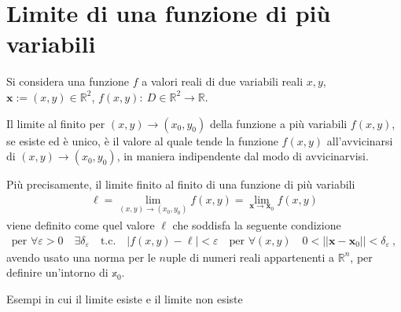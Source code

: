 \documentclass[letterpaper,10pt,italian]{jupyterBook}
\begin{document}
\section{Limite di una funzione di più variabili}
\label{\detokenize{ch/multivariable-calculus/limits:limite-di-una-funzione-di-piu-variabili}}\label{\detokenize{ch/multivariable-calculus/limits:multivariable-calculus-limit}}\label{\detokenize{ch/multivariable-calculus/limits::doc}}
\sphinxAtStartPar
Si considera una funzione \(f\) a valori reali di due variabili reali \(x,y\), \(\mathbf{x} := (x,y) \in \mathbb{R}^2\), \(f(x,y): \ D \in \mathbb{R}^2 \rightarrow \mathbb{R}\).

\sphinxAtStartPar
Il limite al finito per \((x,y) \rightarrow (x_0, y_0)\) della funzione a più variabili \(f(x,y)\), se esiste ed è unico, è il valore al quale tende la funzione \(f(x,y)\) all’avvicinarsi di \((x,y) \rightarrow (x_0, y_0)\), in maniera indipendente dal modo di avvicinarvisi.

\sphinxAtStartPar
Più precisamente, il limite finito al finito di una funzione di più variabili
\begin{equation*}
\begin{split}\ell = \lim_{(x,y) \rightarrow (x_0,y_0)} f(x,y) = \lim_{\mathbf{x} \rightarrow \mathbf{x}_0} f(x,y)\end{split}
\end{equation*}
\sphinxAtStartPar
viene definito come quel valore \(\ell\) che soddisfa la seguente condizione
\begin{equation*}
\begin{split}\text{per } \forall \varepsilon > 0 \quad \exists \delta_{\varepsilon} \quad \text{t.c.} \quad |f(x,y) - \ell| < \varepsilon \quad \text{per } \forall (x,y) \quad 0 < || \mathbf{x} - \mathbf{x}_0|| < \delta_\varepsilon \ ,\end{split}
\end{equation*}
\sphinxAtStartPar
avendo usato una norma per le \(n\)\sphinxhyphen{}uple di numeri reali appartenenti a \(\mathbb{R}^n\), per definire un’intorno di \(\mathbb{x}_0\).

\sphinxAtStartPar
{} Esempi in cui il limite esiste e il limite non esiste

\sphinxstepscope
\end{document}
